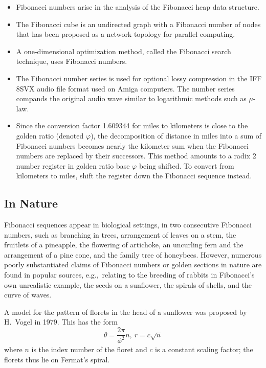 \begin{itemize}
\item Fibonacci numbers arise in the analysis of the Fibonacci heap data structure.

\item The Fibonacci cube is an undirected graph with a Fibonacci number of nodes that has been proposed as a network topology for parallel computing.

\item A one-dimensional optimization method, called the Fibonacci search technique, uses Fibonacci numbers.

\item The Fibonacci number series is used for optional lossy compression in the IFF 8SVX audio file format used on Amiga computers. The number series compands the original audio wave similar to logarithmic methods such as $\mu$-law.

\item Since the conversion factor 1.609344 for miles to kilometers is close to the golden ratio (denoted $\varphi$), the decomposition of distance in miles into a sum of Fibonacci numbers becomes nearly the kilometer sum when the Fibonacci numbers are replaced by their successors. This method amounts to a radix 2 number register in golden ratio base $\varphi$ being shifted. To convert from kilometers to miles, shift the register down the Fibonacci sequence instead.
\end{itemize}


\subsection{In Nature}

Fibonacci sequences appear in biological settings, in two consecutive Fibonacci numbers, such as branching in trees, arrangement of leaves on a stem, the fruitlets of a pineapple, the flowering of artichoke, an uncurling fern and the arrangement of a pine cone, and the family tree of honeybees. However, numerous poorly substantiated claims of Fibonacci numbers or golden sections in nature are found in popular sources, e.g.,~relating to the breeding of rabbits in Fibonacci's own unrealistic example, the seeds on a sunflower, the spirals of shells, and the curve of waves.

A model for the pattern of florets in the head of a sunflower was proposed by H.~Vogel in 1979. \cite{Vogel:1979} This has the form
\begin{equation}
\theta = \frac{2\pi}{\phi^2} n,\  r = c \sqrt{n}
\end{equation}
where $n$ is the index number of the floret and $c$ is a constant scaling factor; the florets thus lie on Fermat's spiral. 

